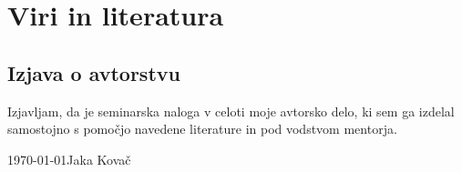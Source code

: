 \documentclass[12pt]{article}
\begin{document}
\newpage
\begingroup
\makeatletter
	\section{Viri in literatura}
	\nocite{*}
	\printbibliography[heading=none]
\makeatother
\endgroup
\newpage

\begin{samepage}
	\thispagestyle{empty}
	\section*{Izjava o avtorstvu}
	Izjavljam, da je seminarska naloga v celoti moje avtorsko delo, ki sem ga 
	izdelal samostojno s pomočjo navedene literature in pod vodstvom mentorja.

	\vfill
	
	\today \hfill Jaka Kovač
	
	\vspace{3 cm}
\end{samepage}
\end{document}
